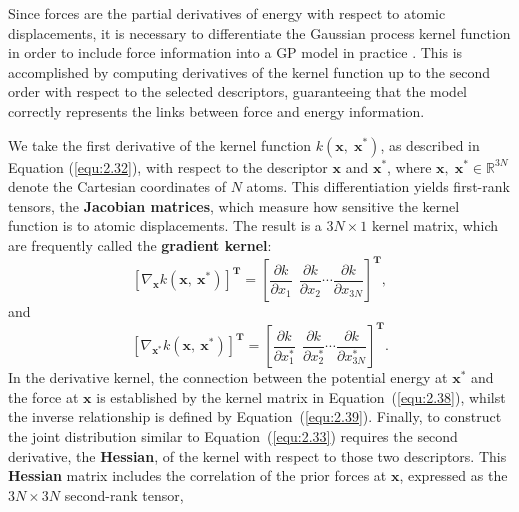 Since forces are the partial derivatives of energy with respect to atomic displacements, it is necessary to differentiate the Gaussian process kernel function in order to include force information into a GP model in practice \cite{GarijodelRo2019, Kaappa2021, Asnaashari2021, Deringer2021}.
This is accomplished by computing derivatives of the kernel function up to the second order with respect to the selected descriptors, guaranteeing that the model correctly represents the links between force and energy information.

We take the first derivative of the kernel function \( k(\mathbf{x},\; \mathbf{x}^{*}) \), as described in Equation (\ref{equ:2.32}), with respect to the descriptor \(\mathbf{x}\) and \(\mathbf{x}^{*}\), where \(\mathbf{x},\; \mathbf{x}^{*} \in \mathbb{R}^{3N}\) denote the Cartesian coordinates of \(N\) atoms. 
This differentiation yields first-rank tensors, the \textbf{Jacobian matrices}, which measure how sensitive the kernel function is to atomic displacements. The result is a \(3N \times 1\) kernel matrix, which are frequently called the \textbf{gradient kernel}:
\begin{equation}
    \label{equ:2.38}
    \left[\nabla_{\mathbf{x}} k(\mathbf{x},\:\mathbf{x}^{*})\right]^{\textbf{T}}
    = \left[\frac{\partial k}{\partial x_{1}}\ \ \frac{\partial k}{\partial x_{2}}\cdots\frac{\partial k}{\partial x_{3N}} \right]^{\textbf{T}},
\end{equation}   
and
\begin{equation}
    \label{equ:2.39}
    \left[\nabla_{\mathbf{x}^{*}} k(\mathbf{x},\:\mathbf{x}^{*})\right]^{\textbf{T}}
    = \left[\frac{\partial k}{\partial x^{*}_{1}}\ \ \frac{\partial k}{\partial x^{*}_{2}}\cdots\frac{\partial k}{\partial x^{*}_{3N}} \right]^{\textbf{T}}.
\end{equation}
In the derivative kernel, the connection between the potential energy at \(\mathbf{x}^{*}\) and the force at \(\mathbf{x}\) is established by the kernel matrix in Equation~(\ref{equ:2.38}), whilst the inverse relationship is defined by Equation~(\ref{equ:2.39}).
Finally, to construct the joint distribution similar to Equation~(\ref{equ:2.33}) requires the second derivative, the \textbf{Hessian}, of the kernel with respect to those two descriptors.
This \textbf{Hessian} matrix includes the correlation of the prior forces at \(\mathbf{x}\), expressed as the $3N\times 3N$ second-rank tensor,
